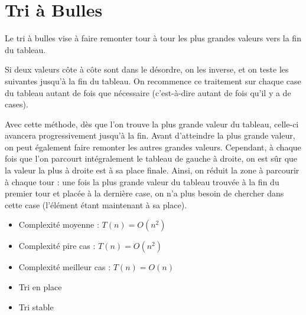 \documentclass[11pt,a4paper]{article}
\begin{document}
\vfillLast

\clearpage


\section{Tri à Bulles}

\medskip

Le tri à bulles vise à faire remonter tour à tour les plus grandes valeurs vers la fin du tableau.

\medskip

Si deux valeurs côte à côte sont dans le désordre, on les inverse, et on teste les suivantes jusqu'à la fin du tableau.
On recommence ce traitement sur chaque case du tableau autant de fois que nécessaire (c'est-à-dire autant de fois qu'il y a de cases).

\medskip

Avec cette méthode, dès que l'on trouve la plus grande valeur du tableau, celle-ci avancera progressivement jusqu'à la fin.
Avant d'atteindre la plus grande valeur, on peut également faire remonter les autres grandes valeurs.
Cependant, à chaque fois que l'on parcourt intégralement le tableau de gauche à droite, on est sûr que la valeur la plus à droite est à sa place finale.
Ainsi, on réduit la zone à parcourir à chaque tour : une fois la plus grande valeur du tableau trouvée à la fin du premier tour et placée à la dernière case, on n'a plus besoin de chercher dans cette case (l'élément étant maintenant à sa place).

\medskip

\begin{itemize}
\item Complexité moyenne : $ T(n) = O(n^{2}) $
\item Complexité pire cas : $ T(n) = O(n^{2}) $
\item Complexité meilleur cas : $ T(n) = O(n) $
\item Tri en place
\item Tri stable
\end{itemize}


\medskip
\end{document}
